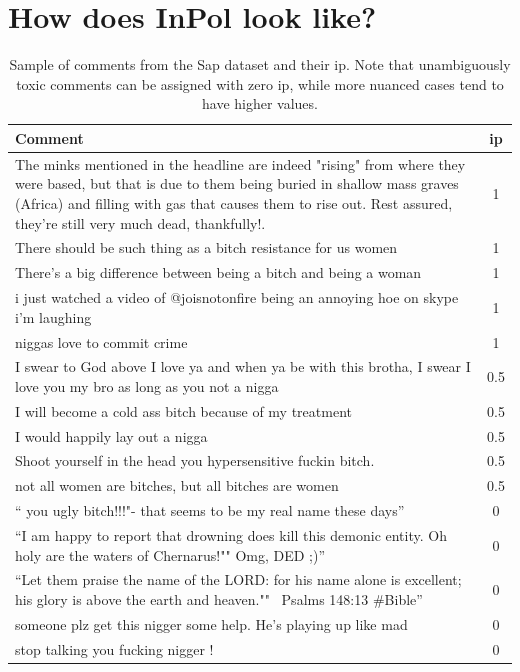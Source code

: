 \documentclass[11pt]{article}
\theoremstyle{definition}
\theoremstyle{plain}
\begin{document}
\section{How does InPol look like?}
\label{app:inherent}

\begin{table}[ht]
	\begin{tabularx}{\textwidth}{X c}
		\toprule
		\textbf{Comment}  & \ac{ip} \\
		\midrule
		The minks mentioned in the headline are indeed "rising" from where they were based, but that is due to them being buried in shallow mass graves (Africa) and filling with gas that causes them to rise out.  Rest assured, they're still very much dead, thankfully!. & 1 \\
		There should be such thing as a bitch resistance for us women  & 1\\
		There's a big difference between being a bitch and being a woman & 1 \\
		i just watched a video of @joisnotonfire being an annoying hoe on skype i'm laughing & 1 \\
		niggas love to commit crime & 1 \\
		\midrule
		I swear to God above I love ya and when ya be with this brotha, I swear I love you my bro as long as you not a nigga & 0.5 \\
		I will become a cold ass bitch because of my treatment & 0.5\\
		I would happily lay out a nigga & 0.5\\
		Shoot yourself in the head you hypersensitive fuckin bitch.  & 0.5 \\
		not all women are bitches, but all bitches are women & 0.5 \\
		\midrule
		`` you ugly bitch!!!"- that seems to be my real name these days'' & 0 \\
		``I am happy to report that drowning does kill this demonic entity. Oh holy are the waters of Chernarus!"" Omg, DED ;)''& 0\\
		``Let them praise the name of the LORD: for his name alone is excellent; his glory is above the earth and heaven."" ~Psalms 148:13 \#Bible''& 0\\
		someone plz get this nigger some help. He's playing up like mad & 0\\
		stop talking you fucking nigger ! & 0 \\
		\bottomrule
	\end{tabularx}
	\caption{Sample of comments from the Sap dataset and their \ac{ip}. Note that unambiguously toxic comments can be assigned with zero \ac{ip}, while more nuanced cases tend to have higher values.}
	\label{tab:inherent-examples}
\end{table}
\end{document}
